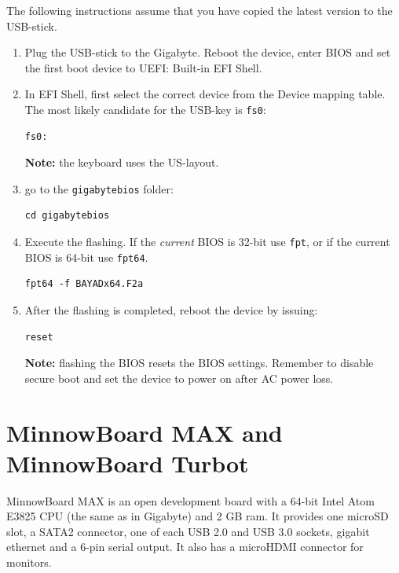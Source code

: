 \documentclass[a4paper,11pt]{article}
\newcommand{\note}{\textbf{Note: }}
\newcommand{\cmd}[1]{\texttt{#1}}
\begin{document}
The following instructions assume that you have copied the latest version to the USB-stick.

\begin{enumerate}

\item Plug the USB-stick to the Gigabyte. Reboot the device, enter BIOS and set the first boot device to UEFI: Built-in EFI Shell.

\item In EFI Shell, first select the correct device from the Device mapping table. The most likely candidate for the USB-key is \cmd{fs0}:
\begin{lstlisting}
fs0:
\end{lstlisting}
\note the keyboard uses the US-layout.

\item go to the \cmd{gigabytebios} folder:

\begin{lstlisting}
cd gigabytebios
\end{lstlisting}

\item Execute the flashing. If the \textit{current} BIOS is 32-bit use \cmd{fpt}, or if the current BIOS is 64-bit use \cmd{fpt64}.

\begin{lstlisting}
fpt64 -f BAYADx64.F2a
\end{lstlisting}

\item After the flashing is completed, reboot the device by issuing:
\begin{lstlisting}
reset
\end{lstlisting}
\note flashing the BIOS resets the BIOS settings. Remember to disable secure boot and set the device to power on after AC power loss.

\end{enumerate}


\section{MinnowBoard MAX and MinnowBoard Turbot}
\label{minnowboard}

MinnowBoard MAX is an open development board with a 64-bit Intel Atom E3825 CPU (the same as in Gigabyte) and 2 GB ram. It provides one microSD slot, a SATA2 connector, one of each USB 2.0 and USB 3.0 sockets, gigabit ethernet and a 6-pin serial output. It also has a microHDMI connector for monitors.
\end{document}
